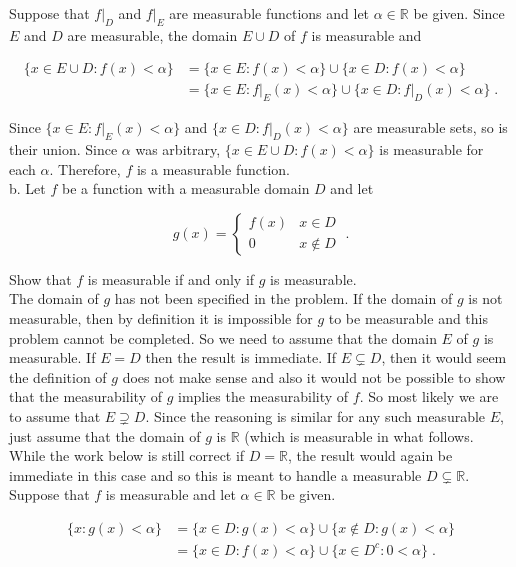 \documentclass[a4paper]{article}
\begin{document}
Suppose that $f\rvert_D$ and $f\rvert_E$ are measurable functions and let $\alpha \in \mathbb{R}$ be given. Since $E$ and $D$ are measurable, the domain $E\cup D$ of $f$ is measurable and

\begin{align*}
\{x \in E\cup D : f(x) < \alpha\} &= \{x \in E : f(x) < \alpha\}\cup \{x \in D : f(x) < \alpha\}\\
&= \{x \in E : f\rvert_E(x) < \alpha\}\cup \{x \in D : f\rvert_D(x) < \alpha\}\;.
\end{align*}

Since $\{x \in E : f\rvert_E(x) < \alpha\}$ and $\{x \in D : f\rvert_D(x) < \alpha\}$ are measurable sets, so is their union. Since $\alpha$ was arbitrary, $\{x \in E\cup D : f(x) < \alpha\}$ is measurable for each $\alpha$. Therefore, $f$ is a measurable function. \\

b. Let $f$ be a function with a measurable domain $D$ and let

$$g(x) = \begin{cases} f(x) & x \in D\\ 0 & x \not\in D \end{cases} \;.$$

Show that $f$ is measurable if and only if $g$ is measurable.\\

The domain of $g$ has not been specified in the problem.  If the domain of $g$ is not measurable, then by definition it is impossible for $g$ to be measurable and this problem cannot be completed. So we need to assume that the domain $E$ of $g$ is measurable. If $E = D$ then the result is immediate. If $E \subsetneq D$, then it would seem the definition of $g$ does not make sense and also it would not be possible to show that the measurability of $g$ implies the measurability of $f$. So most likely we are to assume that $E \supsetneq D$. Since the reasoning is similar for any such measurable $E$, just assume that the domain of $g$ is $\mathbb{R}$ (which is measurable in what follows. While the work below is still correct if $D = \mathbb{R}$, the result would again be immediate in this case and so this is meant to handle a measurable $D \subsetneq \mathbb{R}$. \\

Suppose that $f$ is measurable and let $\alpha \in \mathbb{R}$ be given. 

\begin{align*}
\{x : g(x) < \alpha\} &= \{x \in D : g(x) < \alpha\} \cup \{x \not\in D : g(x) < \alpha\} \\
&= \{x \in D : f(x) < \alpha\} \cup \{x \in D^c : 0 < \alpha\} \;. 
\end{align*}
\end{document}
